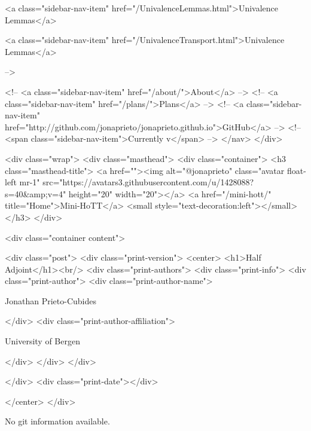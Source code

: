       
    
      
        
          <a class="sidebar-nav-item" href="/UnivalenceLemmas.html">Univalence Lemmas</a>
        
      
    
      
        
          <a class="sidebar-nav-item" href="/UnivalenceTransport.html">Univalence Lemmas</a>
        
      
     -->

    <!-- <a class="sidebar-nav-item" href="/about/">About</a> -->
    <!-- <a class="sidebar-nav-item" href="/plans/">Plans</a> -->
    <!-- <a class="sidebar-nav-item" href="http://github.com/jonaprieto/jonaprieto.github.io">GitHub</a> -->
    <!-- <span class="sidebar-nav-item">Currently v</span> -->
  </nav>
</div>

    <div class="wrap">
      <div class="masthead">
        <div class="container">
          <h3 class="masthead-title">
            <a href=""><img alt="@jonaprieto" class="avatar float-left mr-1" src="https://avatars3.githubusercontent.com/u/1428088?s=40&amp;v=4" height="20" width="20"></a>
            <a href="/mini-hott/" title="Home">Mini-HoTT</a>
            <small style="text-decoration:left"></small>
          </h3>
        </div>
      
      <div class="container content">
        







<div class="post">
  <div class="print-version">
    <center>
      <h1>Half Adjoint</h1><br/>
        <div class="print-authors">
          <div class="print-info">
            <div class="print-author">
              <div class="print-author-name">
                
                  Jonathan Prieto-Cubides
                
              </div>
              <div class="print-author-affiliation">
                
                  University of Bergen
                
                </div>
            </div>
          </div>
          
          
        </div>
        <div class="print-date"></div>
        
        
    </center>
  </div>

  
  No git information available.
  

